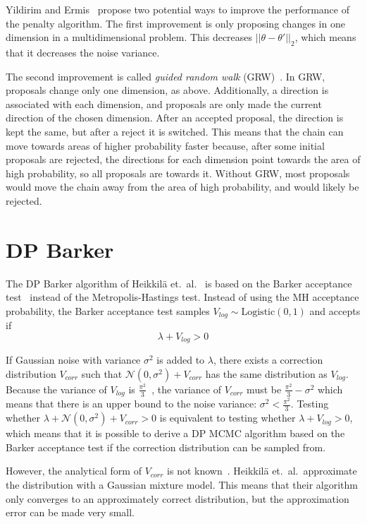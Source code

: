 \documentclass[english,twoside,openright]{HYgraduMLDS}
\newcommand{\caln}{{\mathcal{N}}}
\begin{document}
Yildirim and Ermis~\cite{YildirimE19} propose two potential ways to improve the 
performance of the penalty algorithm. The first improvement is only proposing 
changes in one dimension in a multidimensional problem. This decreases 
\(||\theta - \theta'||_2\), which means that it decreases the noise variance.

The second improvement is called \emph{guided random walk} (GRW)~\cite{YildirimE19}.
In GRW, proposals change only one dimension, as above. Additionally, a direction 
is associated with each dimension, and proposals are only made the current 
direction of the chosen dimension. After an accepted proposal, the direction is 
kept the same, but after a reject it is switched. This means that the chain can
move towards areas of higher probability faster because, after some initial 
proposals are rejected, the directions for each dimension point towards the 
area of high probability, so all proposals are towards it. Without GRW, most 
proposals would move the chain away from the area of high probability, and 
would likely be rejected.

\section{DP Barker}

The DP Barker algorithm of Heikkilä et.\ al.~\cite{HeikkilaJDH19} is based on 
the Barker acceptance test~\cite{Barker65} instead of the Metropolis-Hastings test.
Instead of using the MH acceptance probability, the Barker acceptance test samples 
\(V_{log}\sim \mathrm{Logistic(0, 1)}\) and accepts if 
\[
    \lambda + V_{log} > 0
\]

If Gaussian noise with variance \(\sigma^2\) is added to 
\(\lambda\), there exists a correction 
distribution \(V_{corr}\) such that \(\caln(0, \sigma^2) + V_{corr}\) has the 
same distribution as \(V_{log}\). Because the variance of \(V_{log}\) is 
\(\frac{\pi^2}{3}\)~\cite{HeikkilaJDH19}, the variance of \(V_{corr}\) must be 
\(\frac{\pi^2}{3} - \sigma^2\) which means that there is an upper bound
to the noise variance: \(\sigma^2 < \frac{\pi^2}{3}\). Testing whether 
\(\lambda + \caln(0, \sigma^2) + V_{corr} > 0\) is equivalent to testing 
whether \(\lambda + V_{log} > 0\), which means that it is possible to derive 
a DP MCMC algorithm based on the Barker acceptance test if the correction 
distribution can be sampled from.

However, the analytical form of \(V_{corr}\) is not known~\cite{HeikkilaJDH19}.
Heikkilä et.\ al.\  approximate the distribution with a Gaussian mixture model. 
This means that their 
algorithm only converges to an approximately correct distribution, but the 
approximation error can be made very small.
\end{document}
